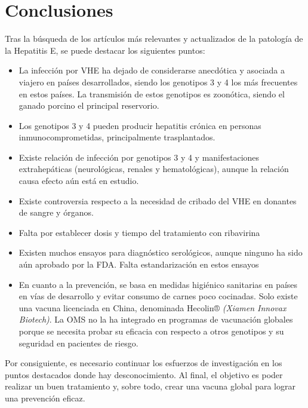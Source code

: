 \documentclass[11 pt]{article}
\begin{document}
\section{Conclusiones}
Tras la búsqueda de los artículos más relevantes y actualizados de la patología de la Hepatitis E, se puede destacar los siguientes puntos:
\begin{itemize}
	\item 
	La infección por VHE ha dejado de considerarse anecdótica y asociada a viajero en países desarrollados, siendo los genotipos 3 y 4 los más frecuentes en estos países. La transmisión de estos genotipos es zoonótica, siendo el ganado porcino el principal reservorio. 
	\item 
	Los genotipos 3 y 4 pueden producir hepatitis crónica en personas inmunocomprometidas, principalmente trasplantados.
	\item 
	Existe relación de infección por genotipos 3 y 4 y manifestaciones extrahepáticas (neurológicas, renales y hematológicas), aunque la relación causa efecto aún está en estudio.
	\item 
	Existe controversia respecto a la necesidad de cribado del VHE en donantes de sangre y órganos.
	\item 
	Falta por establecer dosis y tiempo del tratamiento con ribavirina
	\item 
	Existen muchos ensayos para diagnóstico serológicos, aunque ninguno ha sido aún aprobado por la FDA. Falta estandarización en estos ensayos
	\item 
	En cuanto a la prevención, se basa en medidas higiénico sanitarias en países en vías de desarrollo y evitar consumo de carnes poco cocinadas. Solo existe una vacuna licenciada en China, denominada Hecolin® {\em (Xiamen Innovax Biotech)}. La OMS no la ha integrado en programas de vacunación globales porque se necesita probar su eficacia con respecto a otros genotipos y su seguridad en pacientes de riesgo.
\end{itemize}
Por consiguiente, es necesario continuar los esfuerzos de investigación en los puntos destacados donde hay desconocimiento. Al final, el objetivo es poder realizar un buen tratamiento y, sobre todo, crear una vacuna global para lograr una prevención eficaz.




		
\end{document}
